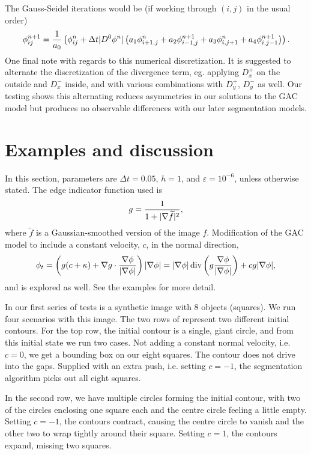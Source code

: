 The Gauss-Seidel iterations would be (if working through $(i,j)$ in the usual order)
\begin{align*}
\phi^{n+1}_{ij} 
= \frac{1}{a_0} 
\left( \phi^n_{ij} + \Delta t \lvert D^0 \phi^n\rvert
\left( a_1 \phi^n_{i+1,j} + a_2 \phi^{n+1}_{i-1,j} + a_3 \phi^{n}_{i,j+1} + a_4 \phi^{n+1}_{i,j-1}
\right)
\right).
\end{align*}
One final note with regards to this numerical discretization. It is suggested to alternate the discretization of the divergence term, eg. applying $D^+_x$ on the outside and $D^-_x$ inside, and with various combinations with $D^+_y$, $D^-_y$ as well. Our testing shows this alternating reduces asymmetries in our solutions to the GAC model but produces no observable differences with our later segmentation models.


\section{Examples and discussion} 
In this section, parameters are $\Delta t = 0.05$, $h = 1$, and $\varepsilon = 10^{-6}$, unless otherwise stated.
The edge indicator function used is 
\begin{align*}
g = \frac{1}{1 + \lvert\nabla \widetilde f\rvert^2 },
\end{align*}
where $\widetilde f$ is a Gaussian-smoothed version of the image $f$. Modification of the GAC model to include a constant velocity, $c$, in the normal direction, 
\begin{align}
\phi_t 
= \left( g ( c + \kappa) + \nabla g \cdot \frac{\nabla \phi}{\lvert\nabla \phi\rvert} \right) \lvert\nabla \phi\rvert
= 
\lvert\nabla \phi\rvert \operatorname{div}\left( g \frac{\nabla \phi}{\lvert\nabla \phi\rvert} \right) 
+ cg \lvert\nabla \phi\rvert,
\label{eq:gac+c}
\end{align}
and is explored as well. See the examples for more detail.


In our first series of tests is a synthetic image with 8 objects (squares). We run four scenarios with this image. The two rows of  represent two different initial contours. For the top row, the initial contour is a single, giant circle, and from this initial state we run two cases.  Not adding a constant normal velocity, i.e. $c = 0$, we get a bounding box on our eight squares. The contour does not drive into the gaps. Supplied with an extra push, i.e. setting $c = -1$, the segmentation algorithm picks out all eight squares.
	
In the second row, we have multiple circles forming the initial contour, with two of the circles enclosing one square each and the centre circle feeling a little empty. Setting $c = -1$, the contours contract, causing the centre circle to vanish and the other two to wrap tightly around their square. Setting $c = 1$, the contours expand, missing two squares.
	

